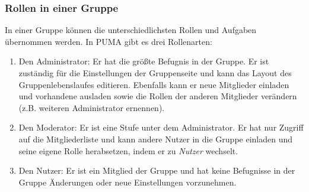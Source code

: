 \documentclass[b5paper,11pt,twoside]{scrbook} %
\begin{document}
\subsubsection{Rollen in einer Gruppe}
In einer Gruppe können die unterschiedlichsten Rollen und Aufgaben übernommen werden. In PUMA gibt es drei Rollenarten:
\begin{enumerate}
    \item Den Administrator: Er hat die größte Befugnis in der Gruppe. Er ist zuständig für die Einstellungen der Gruppenseite und kann das Layout des Gruppenlebenslaufes editieren. Ebenfalls kann er neue Mitglieder einladen und vorhandene ausladen sowie die Rollen der anderen Mitglieder verändern (z.B. weiteren Administrator ernennen).
    \item Den Moderator: Er ist eine Stufe unter dem Administrator. Er hat nur Zugriff auf die Mitgliederliste und kann andere Nutzer in die Gruppe einladen und seine eigene Rolle herabsetzen, indem er zu \textit{Nutzer} wechselt.
    \item Den Nutzer: Er ist ein Mitglied der Gruppe und hat keine Befugnisse in der Gruppe Änderungen oder neue Einstellungen vorzunehmen.
\end{enumerate}
\end{document}
